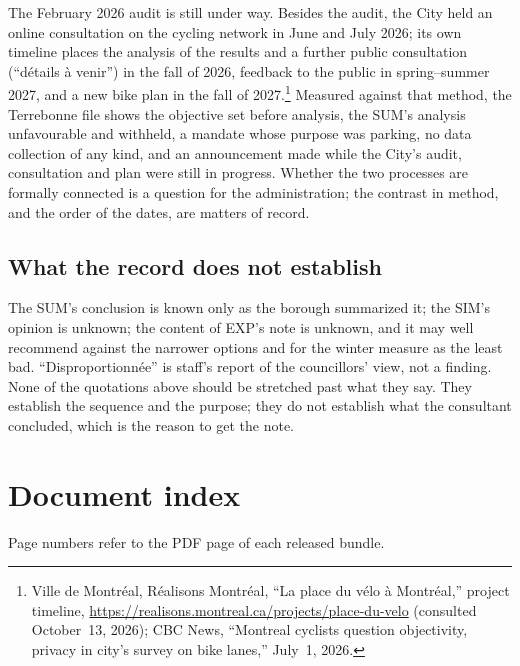 \documentclass[11pt,letterpaper]{article}
\begin{document}
The February 2026 audit is still under way. Besides the audit, the City held an
online consultation on the cycling network in June and July 2026; its own
timeline places the analysis of the results and a further public
consultation (``d\'etails \`a venir'') in the fall of 2026, feedback to
the public in spring--summer 2027, and a new bike plan in the fall of
2027.\footnote{Ville de Montr\'eal, R\'ealisons Montr\'eal, ``La place du
v\'elo \`a Montr\'eal,'' project timeline, \url{https://realisons.montreal.ca/projects/place-du-velo} (consulted
October~13, 2026); CBC News, ``Montreal cyclists question objectivity,
privacy in city's survey on bike lanes,'' July~1, 2026.} Measured against that method, the Terrebonne file shows the
objective set before analysis, the SUM's analysis unfavourable and withheld, a mandate
whose purpose was parking, no data collection of any kind, and an
announcement made while the City's audit, consultation and plan were still
in progress. Whether the two processes are formally connected is a
question for the administration; the contrast in method, and the order of
the dates, are matters of record.

\subsection{What the record does not establish}

The SUM's conclusion is known only as the borough summarized it; the SIM's
opinion is unknown; the content of EXP's note is unknown, and it may well
recommend against the narrower options and for the winter measure as the
least bad. ``Disproportionn\'ee'' is staff's report of the councillors'
view, not a finding. None of the quotations above should be stretched past
what they say. They establish the sequence and the purpose; they do not
establish what the consultant concluded, which is the reason to get the
note.

\section{Document index}

Page numbers refer to the PDF page of each released bundle.
\end{document}
